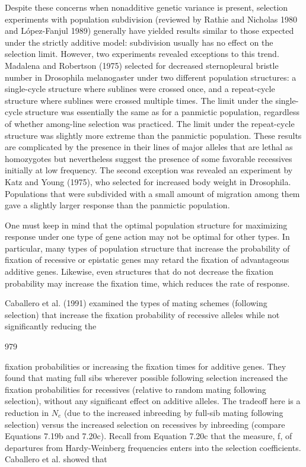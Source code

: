 \documentclass{article}
\begin{document}
{Despite these concerns when nonadditive genetic variance is present, selection experiments with population subdivision (reviewed by Rathie and Nicholas 1980 and López-Fanjul 1989) generally have yielded results similar to those expected under the strictly additive model: subdivision usually has no effect on the selection limit. However, two experiments revealed exceptions to this trend. Madalena and Robertson (1975) selected for decreased sternopleural bristle number in Drosophila melanogaster under two different population structures: a single-cycle structure where sublines were crossed once, and a repeat-cycle structure where sublines were crossed multiple times. The limit under the single-cycle structure was essentially the same as for a panmictic population, regardless of whether among-line selection was practiced. The limit under the repeat-cycle structure was slightly more extreme than the panmictic population. These results are complicated by the presence in their lines of major alleles that are lethal as homozygotes but nevertheless suggest the presence of some favorable recessives initially at low frequency. The second exception was revealed an experiment by Katz and Young (1975), who selected for increased body weight in Drosophila. Populations that were subdivided with a small amount of migration among them gave a slightly larger response than the panmictic population.

One must keep in mind that the optimal population structure for maximizing response under one type of gene action may not be optimal for other types. In particular, many types of population structure that increase the probability of fixation of recessive or epistatic genes may retard the fixation of advantageous additive genes. Likewise, even structures that do not decrease the fixation probability may increase the fixation time, which reduces the rate of response.

Caballero et al. (1991) examined the types of mating schemes (following selection) that increase the fixation probability of recessive alleles while not significantly reducing the

979

fixation probabilities or increasing the fixation times for additive genes. They found that mating full sibs wherever possible following selection increased the fixation probabilities for recessives (relative to random mating following selection), without any significant effect on additive alleles. The tradeoff here is a reduction in  $ N_{e} $ (due to the increased inbreeding by full-sib mating following selection) versus the increased selection on recessives by inbreeding (compare Equations 7.19b and 7.20c). Recall from Equation 7.20c that the measure, f, of departures from Hardy-Weinberg frequencies enters into the selection coefficients. Caballero et al. showed that

}
\end{document}
